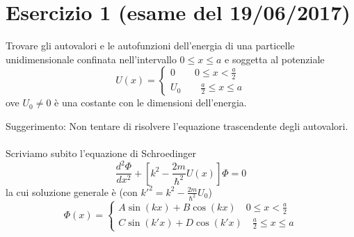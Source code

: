 \documentclass[a4paper]{article}
\begin{document}
    \section*{Esercizio 1 (esame del 19/06/2017)}
        Trovare gli autovalori e le autofunzioni dell'energia di una particelle unidimensionale confinata nell'intervallo $0\leq x\leq a$ e soggetta al potenziale
        \begin{equation*}
            U(x)=
            \begin{cases}
                0\quad\quad 0\leq x <\frac{a}{2}\\
                U_0\quad\quad \frac{a}{2}\leq x \leq a
            \end{cases}
        \end{equation*}
        ove $U_0\neq 0$ è una costante con le dimensioni dell'energia.
        \begin{figure}[H]
            \centering
        \end{figure}
        Suggerimento: Non tentare di risolvere l'equazione trascendente degli autovalori.
        \\
        \\
        Scriviamo subito l'equazione di Schroedinger
        \begin{equation*}
            \frac{d^2\Phi}{dx^2}+\left[k^2-\frac{2m}{\hbar^2}U(x)\right]\Phi=0
        \end{equation*}
        la cui soluzione generale è (con $k'^2=k^2-\frac{2m}{\hbar^2}U_0$)
        \begin{equation*}
            \Phi(x)=
            \begin{cases}
                A\sin(kx)+B\cos(kx)\quad 0\leq x <\frac{a}{2}\\
                C\sin(k'x)+D\cos(k'x)\quad \frac{a}{2}\leq x \leq a
            \end{cases}
        \end{equation*}
\end{document}

